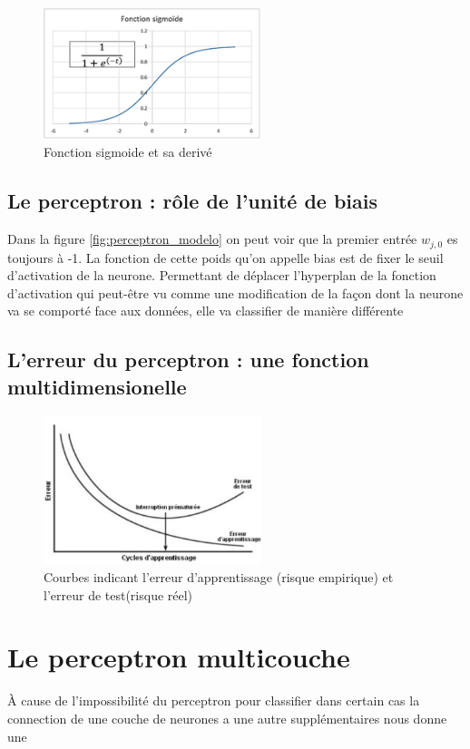 \documentclass[journal]{IEEEtran}
\begin{document}
\begin{figure}[h]
	\centering
	\includegraphics[width=2.5in]{sigmoide}
	\caption{Fonction sigmoide et sa derivé}
	\label{fig:sigmoide}
\end{figure}

\subsection{Le perceptron : rôle de l’unité de biais}
Dans la figure \ref{fig:perceptron_modelo} on peut voir que la premier entrée $ w_{j,0} $ es toujours à -1. La fonction 
de cette poids qu'on appelle bias est de fixer le seuil d'activation de la neurone. Permettant de déplacer l'hyperplan 
de la fonction d'activation qui peut-être vu comme une modification de la façon dont la neurone va se comporté face aux données, elle va classifier de manière différente

\subsection{L’erreur du perceptron : une fonction multidimensionelle}\blindtext

\begin{figure}[h]
	\centering
	\includegraphics[width=2.5in]{error}
	\caption{Courbes indicant l'erreur d'apprentissage (risque empirique) et l'erreur de test(risque réel)}
	\label{fig:courbesError}
\end{figure}

\section{Le perceptron  multicouche}
À cause de l'impossibilité du perceptron  pour classifier dans certain cas la connection de une couche
de neurones a une autre supplémentaires nous donne une 
\end{document}
